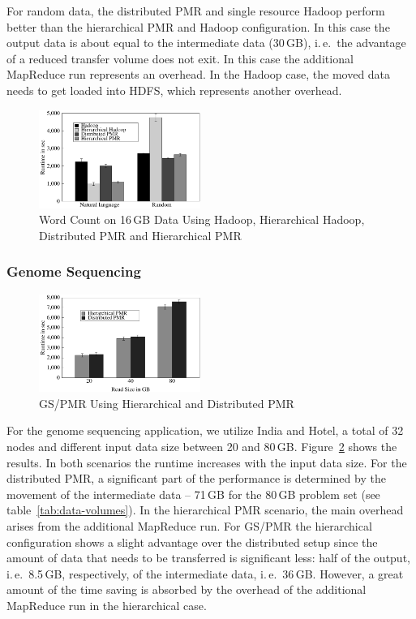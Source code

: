 \documentclass[12pt]{report}
\newcommand{\upp}{\vspace*{-0.5em}}
\begin{document}
For random data, the distributed PMR and single resource Hadoop perform better
than the hierarchical PMR and Hadoop configuration. In this case the output data
is about equal to the intermediate data (30\,GB), i.\,e.\ the advantage of a
reduced transfer volume does not exit. In this case the additional MapReduce run
represents an overhead. In the Hadoop case, the moved data needs to get loaded 
into HDFS, which represents another overhead.


\begin{figure}[ht]
	\centering
		\includegraphics[width=0.47\textwidth]{figures/allmrs_rands.pdf}
\caption{Word Count on 16\,GB Data Using Hadoop, Hierarchical Hadoop, Distributed PMR  and Hierarchical PMR\upp} 	
\label{fig:allmrs_rands}
\end{figure}		


\subsubsection{Genome Sequencing}

\begin{figure}[ht]
	\centering
		\includegraphics[width=0.47\textwidth]{figures/gs_hihmr_dpmr.pdf}
\caption{GS/PMR Using Hierarchical and Distributed PMR\upp\upp\upp} 	
\label{fig:gs_hihmr_dpmr}
\end{figure}		

For the genome sequencing application, we utilize India and Hotel, a total of 32
nodes and different input data size between 20 and 80\,GB.
Figure~\ref{fig:gs_hihmr_dpmr} shows the results. In both scenarios the runtime
increases with the input data size. For the distributed PMR, a significant part
of the performance is determined by the movement of the intermediate data --
71\,GB for the 80\,GB problem set (see table~\ref{tab:data-volumes}). In the
hierarchical PMR scenario, the main overhead arises from the additional
MapReduce run. For GS/PMR the hierarchical configuration shows a slight
advantage over the distributed setup since the amount of data that needs to be
transferred is significant less: half of the output, i.\,e.\ 8.5\,GB,
respectively, of the intermediate data, i.\,e.\ 36\,GB. However, a great amount 
of the time saving is absorbed by the overhead of the additional MapReduce run 
in the hierarchical case.
\end{document}

